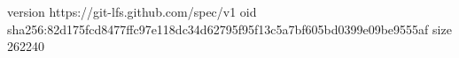 version https://git-lfs.github.com/spec/v1
oid sha256:82d175fcd8477ffc97e118dc34d62795f95f13c5a7bf605bd0399e09be9555af
size 262240
